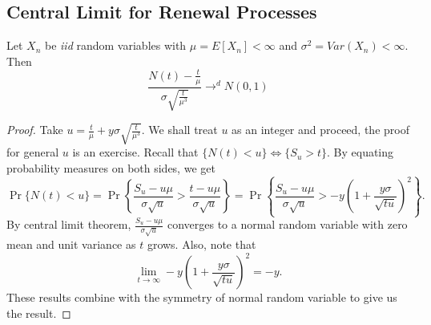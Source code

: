\documentclass[a4paper,10pt]{article}
\begin{document}
\subsection{Central Limit for Renewal Processes}
\begin{thm}
Let $X_n$ be \emph{iid} random variables with $\mu = E[X_n] < \infty$ and $\sigma^2 = Var(X_n) < \infty$. Then
\[\frac{N(t)-\frac{t}{\mu}}{\sigma \sqrt{\frac{t}{\mu^3}}} \to^d N(0,1) \]
\end{thm}
\begin{proof}
Take $u = \frac{t}{\mu} + y \sigma \sqrt{\frac{t}{\mu^3}}$. We shall treat $u$ as an integer and proceed, the proof for general $u$ is an exercise. Recall that $\{N(t) < u\} \iff \{S_u > t\}$. By equating probability measures on both sides, we get
\begin{equation*}
\Pr\{N(t) < u\} = \Pr\left\{\frac{S_u - u\mu}{\sigma \sqrt{u}} > \frac{t - u\mu}{\sigma \sqrt{u}}\right\} = \Pr\left\{\frac{S_u - u\mu}{\sigma \sqrt{u}} > -y\left(1 + \frac{y\sigma}{\sqrt{tu}}\right)^2\right\}.
\end{equation*}
By central limit theorem, $\frac{S_u - u\mu}{\sigma \sqrt{u}}$ converges to a normal random variable with zero mean and unit variance as $t$ grows. Also, note that 
\begin{equation*}
\lim_{t \to \infty} -y\left(1 + \frac{y\sigma}{\sqrt{tu}}\right)^2 = -y.
\end{equation*}
These results combine with the symmetry of normal random variable to give us the result.
\end{proof}
\end{document}
